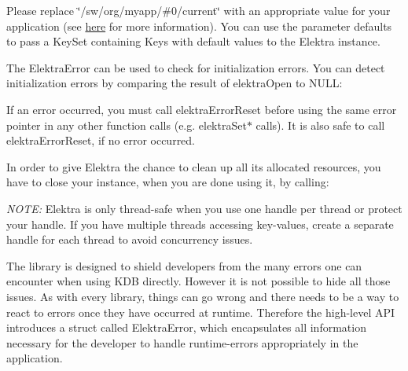 Please replace {\ttfamily \char`\"{}/sw/org/myapp/\#0/current\char`\"{}} with an appropriate value for your application (see \mbox{\hyperlink{doc_tutorials_application-integration_md}{here}} for more information). You can use the parameter {\ttfamily defaults} to pass a {\ttfamily Key\+Set} containing {\ttfamily Key}s with default values to the {\ttfamily Elektra} instance.

The {\ttfamily Elektra\+Error} can be used to check for initialization errors. You can detect initialization errors by comparing the result of {\ttfamily elektra\+Open} to N\+U\+LL\+:


\begin{DoxyCode}{0}
\DoxyCodeLine{\{}
\DoxyCodeLine{  \textcolor{comment}{// handle the error, e.g. print description}}
\DoxyCodeLine{\}}
\end{DoxyCode}


If an error occurred, you must call {\ttfamily elektra\+Error\+Reset} before using the same error pointer in any other function calls (e.\+g. {\ttfamily elektra\+Set$\ast$} calls). It is also safe to call {\ttfamily elektra\+Error\+Reset}, if no error occurred.

In order to give Elektra the chance to clean up all its allocated resources, you have to close your instance, when you are done using it, by calling\+:


\begin{DoxyCode}{0}
\end{DoxyCode}


{\itshape N\+O\+TE\+:} Elektra is only thread-\/safe when you use one handle per thread or protect your handle. If you have multiple threads accessing key-\/values, create a separate handle for each thread to avoid concurrency issues.

The library is designed to shield developers from the many errors one can encounter when using K\+DB directly. However it is not possible to hide all those issues. As with every library, things can go wrong and there needs to be a way to react to errors once they have occurred at runtime. Therefore the high-\/level A\+PI introduces a struct called {\ttfamily Elektra\+Error}, which encapsulates all information necessary for the developer to handle runtime-\/errors appropriately in the application.

